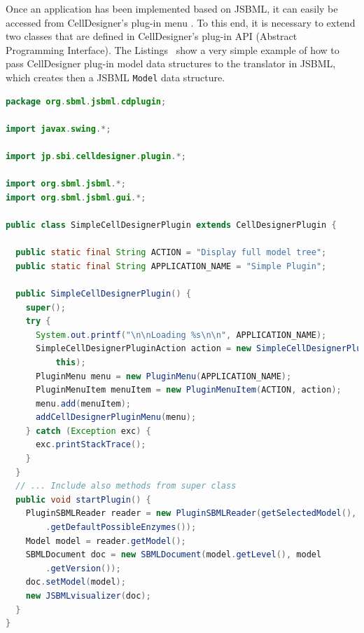\documentclass[
  letterpaper,
  11pt,
  headsepline,
  pointlessnumbers,
  tablecaptionabove,
  headinclude,
  appendixprefix,
  idxtotoc,
  bibtotoc,
  titlepage
]{scrartcl}
\begin{document}
Once an application has been implemented based on JSBML, it can easily be
accessed from CellDesigner's plug-in menu \citep{Funahashi2003}. To this end,
it is necessary to extend two classes that are defined in CellDesigner's plug-in
API (Abstract Programming Interface). The
Listings~ show a very simple example of
how to pass CellDesigner plug-in model data structures to the translator in
JSBML, which creates then a JSBML \verb!Model! data structure.

% 
\begin{lstlisting}[language=Java,float,caption={A simple example for a
CellDesigner plug-in using JSBML as a communication layer},label=lst:Plugin]
package org.sbml.jsbml.cdplugin;

import javax.swing.*;

import jp.sbi.celldesigner.plugin.*;

import org.sbml.jsbml.*;
import org.sbml.jsbml.gui.*;

public class SimpleCellDesignerPlugin extends CellDesignerPlugin {

  public static final String ACTION = "Display full model tree";
  public static final String APPLICATION_NAME = "Simple Plugin";

  public SimpleCellDesignerPlugin() {
    super();
    try {
      System.out.printf("\n\nLoading %s\n\n", APPLICATION_NAME);
      SimpleCellDesignerPluginAction action = new SimpleCellDesignerPluginAction(
          this);
      PluginMenu menu = new PluginMenu(APPLICATION_NAME);
      PluginMenuItem menuItem = new PluginMenuItem(ACTION, action);
      menu.add(menuItem);
      addCellDesignerPluginMenu(menu);
    } catch (Exception exc) {
      exc.printStackTrace();
    }
  }
  // ... Include also methods from super class
  public void startPlugin() {
    PluginSBMLReader reader = new PluginSBMLReader(getSelectedModel(), SBO
        .getDefaultPossibleEnzymes());
    Model model = reader.getModel();
    SBMLDocument doc = new SBMLDocument(model.getLevel(), model
        .getVersion());
    doc.setModel(model);
    new JSBMLvisualizer(doc);
  }
}
\end{lstlisting}
\end{document}

